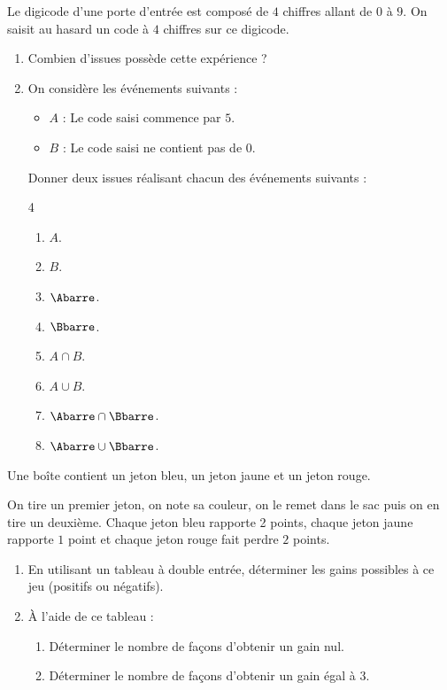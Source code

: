 \exo

Le digicode d'une porte d'entrée est composé de $4$ chiffres allant de $0$ à $9$. On saisit au hasard un code à $4$ chiffres sur ce digicode.
\begin{enumerate}
\item Combien d'issues possède cette expérience ?
\item On considère les événements suivants :
\begin{itemize}
\item $A$ : \og Le code saisi commence par $5$. \fg{}
\item $B$ : \og Le code saisi ne contient pas de $0$. \fg{}
\end{itemize}
Donner deux issues réalisant chacun des événements suivants :
\vspace{-6pt}
\setlength{\columnsep}{1cm}
\setlength{\columnseprule}{0pt}
\begin{multicols}{4}
\begin{enumerate}
\item $A$.
\item $B$.
\item $\Abarre$.
\item $\Bbarre$.
\item $A\cap B$.
\item $A\cup B$.
\item $\Abarre\cap\Bbarre$.
\item $\Abarre\cup\Bbarre$.
\end{enumerate}
\end{multicols}
\vspace{-6pt}
\end{enumerate}

\exo

Une boîte contient un jeton bleu, un jeton jaune et un jeton rouge.

On tire un premier jeton, on note sa couleur, on le remet dans le sac puis on en tire un deuxième. Chaque jeton bleu rapporte 2 points, chaque jeton jaune rapporte $1$ point et chaque jeton rouge fait perdre $2$ points.
\begin{enumerate}
\item En utilisant un tableau à double entrée, déterminer les gains possibles à ce jeu (positifs ou négatifs).
\item À l'aide de ce tableau :
\begin{enumerate}
\item Déterminer le nombre de façons d'obtenir un gain nul.
\item Déterminer le nombre de façons d'obtenir un gain égal à $3$.
\end{enumerate}
\end{enumerate}

